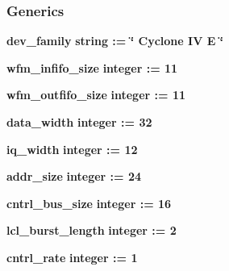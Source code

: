 \subsubsection*{Generics}
 \begin{DoxyCompactItemize}
\item 
{\bf dev\+\_\+family} {\bfseries {\bfseries \textcolor{comment}{string}\textcolor{vhdlchar}{ }\textcolor{vhdlchar}{ }\textcolor{vhdlchar}{\+:}\textcolor{vhdlchar}{=}\textcolor{vhdlchar}{ }\textcolor{vhdlchar}{ }\textcolor{vhdlchar}{ }\textcolor{vhdlchar}{ }\textcolor{keyword}{\char`\"{} Cyclone I\+V E \char`\"{}}\textcolor{vhdlchar}{ }}}
\item 
{\bf wfm\+\_\+infifo\+\_\+size} {\bfseries {\bfseries \textcolor{comment}{integer}\textcolor{vhdlchar}{ }\textcolor{vhdlchar}{ }\textcolor{vhdlchar}{\+:}\textcolor{vhdlchar}{=}\textcolor{vhdlchar}{ }\textcolor{vhdlchar}{ } \textcolor{vhdldigit}{11} \textcolor{vhdlchar}{ }}}
\item 
{\bf wfm\+\_\+outfifo\+\_\+size} {\bfseries {\bfseries \textcolor{comment}{integer}\textcolor{vhdlchar}{ }\textcolor{vhdlchar}{ }\textcolor{vhdlchar}{\+:}\textcolor{vhdlchar}{=}\textcolor{vhdlchar}{ }\textcolor{vhdlchar}{ } \textcolor{vhdldigit}{11} \textcolor{vhdlchar}{ }}}
\item 
{\bf data\+\_\+width} {\bfseries {\bfseries \textcolor{comment}{integer}\textcolor{vhdlchar}{ }\textcolor{vhdlchar}{ }\textcolor{vhdlchar}{\+:}\textcolor{vhdlchar}{=}\textcolor{vhdlchar}{ }\textcolor{vhdlchar}{ } \textcolor{vhdldigit}{32} \textcolor{vhdlchar}{ }}}
\item 
{\bf iq\+\_\+width} {\bfseries {\bfseries \textcolor{comment}{integer}\textcolor{vhdlchar}{ }\textcolor{vhdlchar}{ }\textcolor{vhdlchar}{\+:}\textcolor{vhdlchar}{=}\textcolor{vhdlchar}{ }\textcolor{vhdlchar}{ } \textcolor{vhdldigit}{12} \textcolor{vhdlchar}{ }}}
\item 
{\bf addr\+\_\+size} {\bfseries {\bfseries \textcolor{comment}{integer}\textcolor{vhdlchar}{ }\textcolor{vhdlchar}{ }\textcolor{vhdlchar}{\+:}\textcolor{vhdlchar}{=}\textcolor{vhdlchar}{ }\textcolor{vhdlchar}{ } \textcolor{vhdldigit}{24} \textcolor{vhdlchar}{ }}}
\item 
{\bf cntrl\+\_\+bus\+\_\+size} {\bfseries {\bfseries \textcolor{comment}{integer}\textcolor{vhdlchar}{ }\textcolor{vhdlchar}{ }\textcolor{vhdlchar}{\+:}\textcolor{vhdlchar}{=}\textcolor{vhdlchar}{ }\textcolor{vhdlchar}{ } \textcolor{vhdldigit}{16} \textcolor{vhdlchar}{ }}}
\item 
{\bf lcl\+\_\+burst\+\_\+length} {\bfseries {\bfseries \textcolor{comment}{integer}\textcolor{vhdlchar}{ }\textcolor{vhdlchar}{ }\textcolor{vhdlchar}{\+:}\textcolor{vhdlchar}{=}\textcolor{vhdlchar}{ }\textcolor{vhdlchar}{ } \textcolor{vhdldigit}{2} \textcolor{vhdlchar}{ }}}
\item 
{\bf cntrl\+\_\+rate} {\bfseries {\bfseries \textcolor{comment}{integer}\textcolor{vhdlchar}{ }\textcolor{vhdlchar}{ }\textcolor{vhdlchar}{\+:}\textcolor{vhdlchar}{=}\textcolor{vhdlchar}{ }\textcolor{vhdlchar}{ } \textcolor{vhdldigit}{1} \textcolor{vhdlchar}{ }}}
\end{DoxyCompactItemize}
